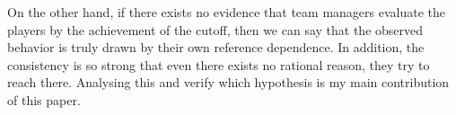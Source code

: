 \documentclass[dvipdfmx, 12pt]{article}
\begin{document}
  On the other hand, if there exists no evidence that team managers evaluate the players by the achievement of the cutoff, then we can say that the observed behavior is truly drawn by their own reference dependence. In addition, the consistency is so strong that even there exists no rational reason, they try to reach there. Analysing this and verify which hypothesis is my main contribution of this paper.
\end{document}
